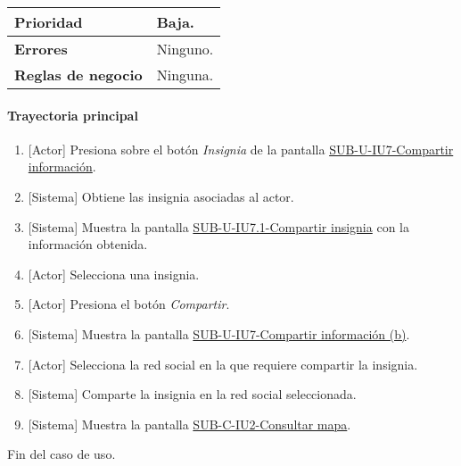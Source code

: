 \begin{longtable}{|J{5cm}|J{10.3cm}|}
		\\ \hline 
	\textbf{Prioridad} & 
		Baja. \\ \hline
	\textbf{Errores} & Ninguno.
		\\ \hline
	\textbf{Reglas de negocio} & Ninguna.
		 \\ \hline
\end{longtable}

\paragraph{Trayectoria principal}
	\begin{enumerate}
		\item {[Actor]} Presiona sobre el botón \textit{Insignia} de la pantalla \hyperref[fig:sub-u-iu7]{SUB-U-IU7-Compartir información}.
		\item {[Sistema]} Obtiene las insignia asociadas al actor.
		\item {[Sistema]} Muestra la pantalla \hyperref[fig:sub-u-iu7.1]{SUB-U-IU7.1-Compartir insignia} con la información obtenida.
		\item {[Actor]} Selecciona una insignia.
		\item {[Actor]} Presiona el botón \textit{Compartir}.
		\item \label{SUB-U-CU7.1:Pantalla} {[Sistema]} Muestra la pantalla \hyperref[fig:sub-u-iu7.b]{SUB-U-IU7-Compartir información (b)}.
		\item {[Actor]} Selecciona la red social en la que requiere compartir la insignia.
		\item {[Sistema]} Comparte la insignia en la red social seleccionada.
		\item \label{SUB-U-CU1:Pantalla} {[Sistema]} Muestra la pantalla \hyperref[fig:sub-c-iu2]{SUB-C-IU2-Consultar mapa}.
	\end{enumerate}
	Fin del caso de uso.

